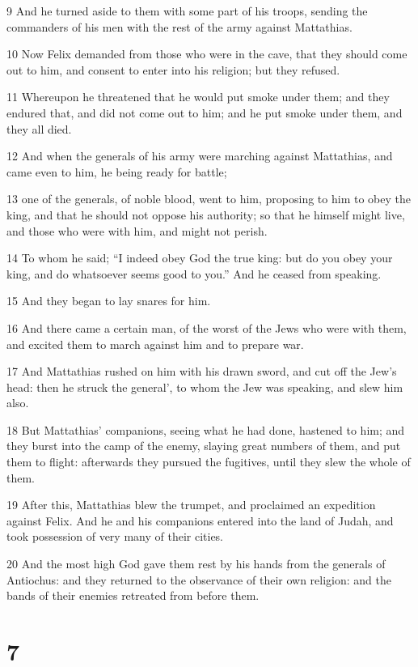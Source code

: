 9 And he turned aside to them with some part of his troops, sending the commanders of his men with the rest of the army against Mattathias. 

10 Now Felix demanded from those who were in the cave, that they should come out to him, and consent to enter into his religion; but they refused. 

11 Whereupon he threatened that he would put smoke under them; and they endured that, and did not come out to him; and he put smoke under them, and they all died.

12 And when the generals of his army were marching against Mattathias, and came even to him, he being ready for battle; 

13 one of the generals, of noble blood, went to him, proposing to him to obey the king, and that he should not oppose his authority; so that he himself might live, and those who were with him, and might not perish. 

14 To whom he said; “I indeed obey God the true king: but do you obey your king, and do whatsoever seems good to you.” And he ceased from speaking. 

15 And they began to lay snares for him. 

16 And there came a certain man, of the worst of the Jews who were with them, and excited them to march against him and to prepare war. 

17 And Mattathias rushed on him with his drawn sword, and cut off the Jew’s head: then he struck the general’, to whom the Jew was speaking, and slew him also. 

18 But Mattathias’ companions, seeing what he had done, hastened to him; and they burst into the camp of the enemy, slaying great numbers of them, and put them to flight: afterwards they pursued the fugitives, until they slew the whole of them. 

19 After this, Mattathias blew the trumpet, and proclaimed an expedition against Felix. And he and his companions entered into the land of Judah, and took possession of very many of their cities. 

20 And the most high God gave them rest by his hands from the generals of Antiochus: and they returned to the observance of their own religion: and the bands of their enemies retreated from before them. 

\chapter{7}

